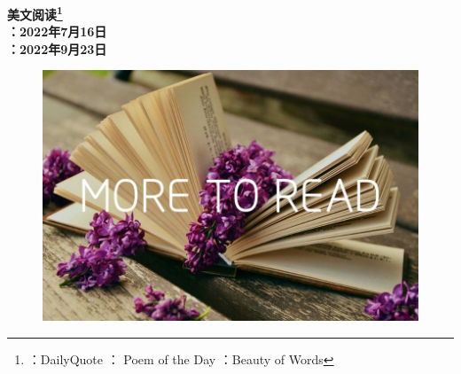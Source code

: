 \documentclass[UTF8,11pt,,oneside,final, ]{ctexart}
\newcommand{\dailyquote}[3] %
{	
	\ctexset{
		subsection/format =\raggedright,
	}
	\begin{figure}[h]
		\centering
		\texttt{[image: \#3]}
		\label{fig:#3}
	\end{figure}
	\subsection{{\color{violet}\faQuoteLeft}\quad\large\bfseries DailyQuote}
	\begin{quotation}
		#1
		\begin{flushright}
			\textit{——#2}
		\end{flushright}
	\end{quotation}
\ctexset{
	subsection/format =\centering,
}
}
\newcommand{\poems}[6]
{	\subsection{{\color{violet}\faFeather}\quad \large\bfseries #1}
	\begin{flushright}
		\textit{#2}
	\end{flushright}
	\begin{Parallel}{#3}{#5}
		\ParallelLText
		{#4	}
		
		\ParallelRText
		{#6}
	\end{Parallel}
}
\newcommand{\words}[3]{
	\subsection{{\color{violet}\faBookReader}\quad\large\bfseries #1}
\begin{flushright}
\textit{#2}
\end{flushright}
{
	
	#3}
}
\begin{document}
	
\pagestyle{empty}
\begin{titlepage}
\begin{center}
	{ \textbf{{\color{violet}\faPodcast} 美文阅读\footnote{
				{\color{violet}\faQuoteLeft}：DailyQuote\qquad 
				{\color{violet}\faFeather}： Poem of the Day \qquad 
				{\color{violet}\faBookReader}：Beauty of Words }}}\\
	\vspace{4ex}
	{\textbf{\faDoorOpen：2022年7月16日}}\\
	
		\vspace{4ex}
	{\textbf{\faDoorClosed：2022年9月23日}}
			
		\begin{figure}
			\centering
			\includegraphics[width=1\linewidth]{more2read.jpg}
			\caption*{}
			\label{fig:more2read}
		\end{figure}
\end{center}
\end{titlepage}
\thispagestyle{empty}
\pagestyle{empty}
\newpage
\tableofcontents













%
%

\end{document}
